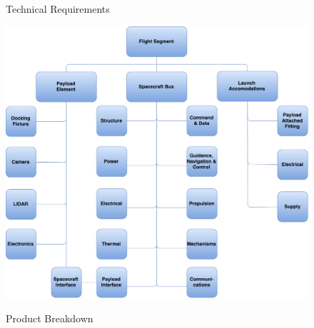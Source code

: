 \documentclass[onecolumn,10pt]{jhwhw}
\begin{document}
\begin{figure}[h!]
\begin{center}
\end{center}
\caption{Technical Requirements}
\end{figure}

\begin{figure}[h!]
\begin{center}
\includegraphics[width=1\textwidth]{4.3-2 (Product Breakdown)}
\label{fig:on}
\end{center}
\caption{Product Breakdown}
\end{figure}
\end{document}
